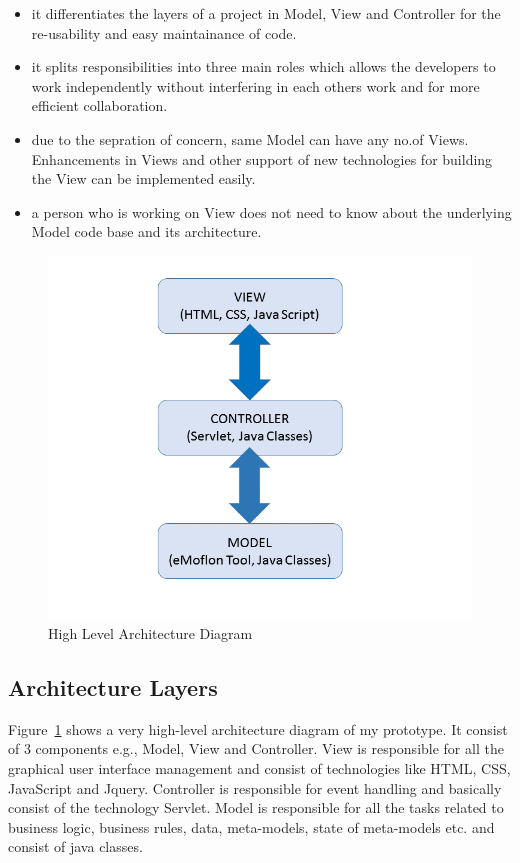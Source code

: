 \begin{itemize}
	\item {it differentiates the layers of a project in Model, View and Controller for the re-usability and easy maintainance of code.}
	\item {it splits responsibilities into three main roles which allows the developers to work independently without interfering in each others work and for more efficient collaboration.}
	\item {due to the sepration of concern, same Model can have any no.of Views. Enhancements in Views and other support of new technologies for building the View can be implemented easily.}
	\item {a person who is working on View does not need to know about the underlying Model code base and its architecture.}
\end{itemize}

\begin{figure}
	\includegraphics[width=1\textwidth]{figures/Highlevel_Arch}
	\caption{High Level Architecture Diagram}
	\label{fig:Architecture_Diagram}
\end{figure}

\subsection{Architecture Layers}\label{subsec:design_layers}
Figure~\ref{fig:Architecture_Diagram} shows a very high-level architecture diagram of my prototype. It consist of 3 components e.g., Model, View and Controller. View is responsible for all the graphical user interface management and consist of technologies like HTML, CSS, JavaScript and Jquery. Controller is responsible for event handling and basically consist of the technology Servlet. Model is responsible for all the tasks related to business logic, business rules, data, meta-models, state of meta-models etc. and consist of java classes.

